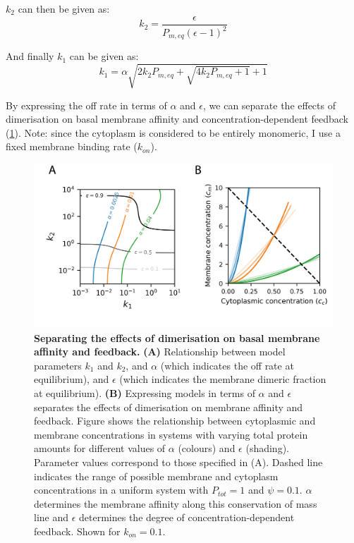 \documentclass[12pt]{"report"}
\newcommand{\mycaption}[2]{\caption[#1]{\textbf{#1.} #2}}
\begin{document}
$k_2$ can then be given as:
\begin{equation}
k_2 = \frac{\epsilon}{P_{m, eq} (\epsilon - 1)^2}
\end{equation}

And finally $k_1$ can be given as:
\begin{equation}
k_1 = \alpha \sqrt{2 k_2 P_{m, eq} + \sqrt{4 k_2 P_{m, eq} + 1 } + 1}
\end{equation}

By expressing the off rate in terms of $\alpha$ and $\epsilon$, we can separate the effects of dimerisation on basal membrane affinity and concentration-dependent feedback (\cref{fig:epsilon_vs_koff}). Note: since the cytoplasm is considered to be entirely monomeric, I use a fixed membrane binding rate ($k_{on}$). \\

\begin{figure}
\includegraphics[scale=1]{epsilon_vs_koff}
\centering
\mycaption{Separating the effects of dimerisation on basal membrane affinity and feedback}{
\textbf{(A)} Relationship between model parameters $k_1$ and $k_2$, and $\alpha$ (which indicates the off rate at equilibrium), and $\epsilon$ (which indicates the membrane dimeric fraction at equilibrium).
\textbf{(B)} Expressing models in terms of $\alpha$ and $\epsilon$ separates the effects of dimerisation on membrane affinity and feedback. Figure shows the relationship between cytoplasmic and membrane concentrations in systems with varying total protein amounts for different values of $\alpha$ (colours) and $\epsilon$ (shading). Parameter values correspond to those specified in (A). Dashed line indicates the range of possible membrane and cytoplasm concentrations in a uniform system with $P_{tot}  = 1$ and $\psi = 0.1$. $\alpha$ determines the membrane affinity along this conservation of mass line and $\epsilon$ determines the degree of concentration-dependent feedback. Shown for $k_{on} = 0.1$.
}
\label{fig:epsilon_vs_koff}
\end{figure}
\end{document}
